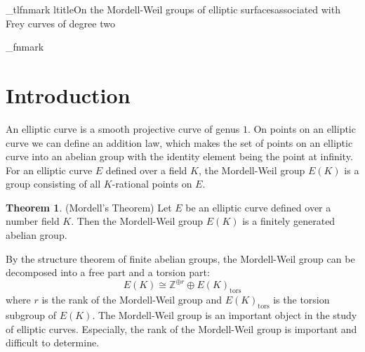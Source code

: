 \documentclass[a4paper]{jarticle} %
\theoremstyle{definition}
\newtheorem{thm}{Theorem}[section]
\theoremstyle{remark}
\begin{document}
%
%
\no_tlfnmark %
%
\2ltitle{On the Mordell-Weil groups of elliptic surfaces}{associated with Frey curves of degree two} %
%
\begin{preliminary}
\end{preliminary}
%
%
%
\init_fnmark %

\section{Introduction}
An elliptic curve is a smooth projective curve of genus $1$.
On points on an elliptic curve we can define an addition law, which makes the set of points on an elliptic curve into an abelian group with the identity element being the point at infinity.
For an elliptic curve $E$ defined over a field $K$, the Mordell-Weil group $E(K)$ is a group consisting of all $K$-rational points on $E$.

\begin{thm}{(Mordell's Theorem)}
    \label{thm:mordell}
    Let $E$ be an elliptic curve defined over a number field $K$.
    Then the Mordell-Weil group $E(K)$ is a finitely generated abelian group.
\end{thm}
By the structure theorem of finite abelian groups, the Mordell-Weil group can be decomposed into a free part and a torsion part:
\begin{equation*}
    E(K) \cong \mathbb{Z}^{\oplus r} \oplus E(K)_{\text{tors}}
\end{equation*}
where $r$ is the rank of the Mordell-Weil group and $E(K)_{\text{tors}}$ is the torsion subgroup of $E(K)$.
The Mordell-Weil group is an important object in the study of elliptic curves.
Especially, the rank of the Mordell-Weil group is important and difficult to determine.
\end{document}
